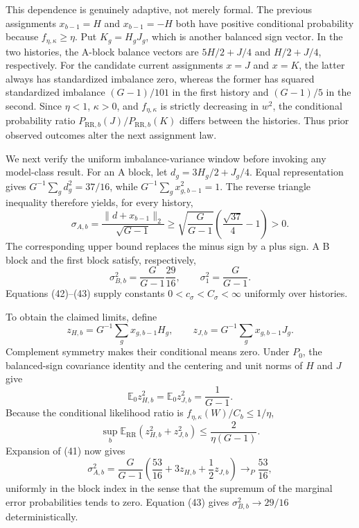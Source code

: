 This dependence is genuinely adaptive, not merely formal.  The previous assignments \(x_{b-1}=H\) and \(x_{b-1}=-H\) both have positive conditional probability because \(f_{\eta,\kappa}\geq\eta\).  Put \(K_g=H_gJ_g\), which is another balanced sign vector.  In the two histories, the A-block balance vectors are \(5H/2+J/4\) and \(H/2+J/4\), respectively.  For the candidate current assignments \(x=J\) and \(x=K\), the latter always has standardized imbalance zero, whereas the former has squared standardized imbalance \((G-1)/101\) in the first history and \((G-1)/5\) in the second.  Since \(\eta<1\), \(\kappa>0\), and \(f_{\eta,\kappa}\) is strictly decreasing in \(w^2\), the conditional probability ratio \(P_{\mathrm{RR},b}(J)/P_{\mathrm{RR},b}(K)\) differs between the histories.  Thus prior observed outcomes alter the next assignment law.

We next verify the uniform imbalance-variance window before invoking any model-class result.  For an A block, let \(d_g=3H_g/2+J_g/4\).  Equal representation gives \(G^{-1}\sum_gd_g^2=37/16\), while \(G^{-1}\sum_gx_{g,b-1}^2=1\).  The reverse triangle inequality therefore yields, for every history,
\[
 \sigma_{A,b}
 =\frac{\|d+x_{b-1}\|_2}{\sqrt{G-1}}
 \geq\sqrt{\frac G{G-1}}\left(\frac{\sqrt{37}}4-1\right)>0. \tag{42}
\]
The corresponding upper bound replaces the minus sign by a plus sign.  A B block and the first block satisfy, respectively,
\[
 \sigma_{B,b}^2=\frac G{G-1}\frac{29}{16},
 \qquad \sigma_1^2=\frac G{G-1}.                            \tag{43}
\]
Equations (42)--(43) supply constants \(0<c_\sigma<C_\sigma<\infty\) uniformly over histories.

To obtain the claimed limits, define
\[
 z_{H,b}=G^{-1}\sum_gx_{g,b-1}H_g,
 \qquad z_{J,b}=G^{-1}\sum_gx_{g,b-1}J_g.
\]
Complement symmetry makes their conditional means zero.  Under \(P_0\), the balanced-sign covariance identity and the centering and unit norms of \(H\) and \(J\) give
\[
 \mathbb E_0z_{H,b}^2=\mathbb E_0z_{J,b}^2=\frac1{G-1}.
\]
Because the conditional likelihood ratio is \(f_{\eta,\kappa}(W)/C_b\leq1/\eta\),
\[
 \sup_b\mathbb E_{\mathrm{RR}}(z_{H,b}^2+z_{J,b}^2)
 \leq\frac2{\eta(G-1)}.                                    \tag{44}
\]
Expansion of (41) now gives
\[
 \sigma_{A,b}^2
 =\frac G{G-1}\left(\frac{53}{16}+3z_{H,b}+\frac12z_{J,b}\right)
 \longrightarrow_P\frac{53}{16},                           \tag{45}
\]
uniformly in the block index in the sense that the supremum of the marginal error probabilities tends to zero.  Equation (43) gives \(\sigma_{B,b}^2\to29/16\) deterministically.

